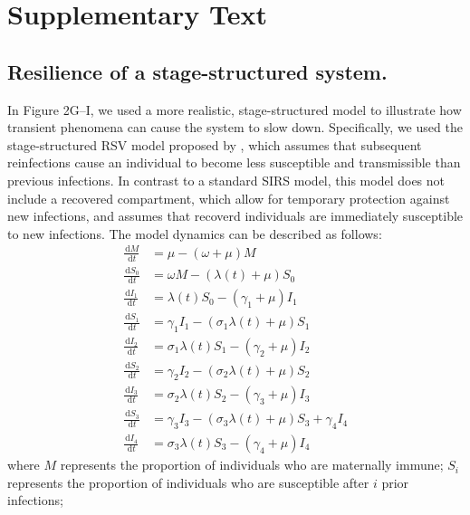 \documentclass[12pt]{article}
\newcommand{\dd}[1]{\ensuremath{\, \mathrm{d}#1}}
\begin{document}
\pagebreak

\setcounter{figure}{0}
\setcounter{equation}{0}
\renewcommand{\thefigure}{S\arabic{figure}}
\renewcommand{\theequation}{S\arabic{equation}}

\section*{Supplementary Text}

\subsection*{Resilience of a stage-structured system.}

In Figure 2G--I, we used a more realistic, stage-structured model to illustrate how transient phenomena can cause the system to slow down.
Specifically, we used the stage-structured RSV model proposed by \citep{pitzer2015environmental}, which assumes that subsequent reinfections cause an individual to become less susceptible and transmissible than previous infections.
In contrast to a standard SIRS model, this model does not include a recovered compartment, which allow for temporary protection against new infections, and assumes that recoverd individuals are immediately susceptible to new infections.
The model dynamics can be described as follows:
\begin{align}
\frac{\dd M}{\dd t} &= \mu - (\omega + \mu) M\\
\frac{\dd S_0}{\dd t} &= \omega M - (\lambda(t) + \mu) S_0\\
\frac{\dd I_1}{\dd t} &= \lambda(t) S_0 - (\gamma_1 + \mu) I_1\\
\frac{\dd S_1}{\dd t} &= \gamma_1 I_1 - (\sigma_1 \lambda(t) + \mu) S_1\\
\frac{\dd I_2}{\dd t} &= \sigma_1 \lambda(t) S_1 - (\gamma_2 + \mu) I_2\\
\frac{\dd S_2}{\dd t} &= \gamma_2 I_2 - (\sigma_2 \lambda(t) + \mu) S_2\\
\frac{\dd I_3}{\dd t} &= \sigma_2 \lambda(t) S_2 - (\gamma_3 + \mu) I_3\\
\frac{\dd S_3}{\dd t} &= \gamma_3 I_3 - (\sigma_3 \lambda(t) + \mu) S_3 + \gamma_4 I_4\\
\frac{\dd I_4}{\dd t} &= \sigma_3 \lambda(t) S_3 - (\gamma_4 + \mu) I_4
\end{align}
where $M$ represents the proportion of individuals who are maternally immune;
$S_i$ represents the proportion of individuals who are susceptible after $i$ prior infections;
\end{document}
